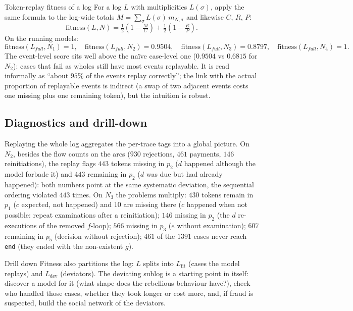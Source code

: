 \begin{definitionbox}{Token-replay fitness of a log}
For a log $L$ with multiplicities $L(\sigma)$, apply the same formula to the log-wide totals $M = \sum_{\sigma} L(\sigma)\, m_{N,\sigma}$ and likewise $C$, $R$, $P$:
$$\text{fitness}(L, N) = \tfrac{1}{2}\!\left(1 - \tfrac{M}{C}\right) + \tfrac{1}{2}\!\left(1 - \tfrac{R}{P}\right).$$
On the running models:
$$\text{fitness}(L_{full}, N_1) = 1, \quad \text{fitness}(L_{full}, N_2) = 0.9504, \quad \text{fitness}(L_{full}, N_3) = 0.8797, \quad \text{fitness}(L_{full}, N_4) = 1.$$
The event-level score sits well above the naïve case-level one ($0.9504$ vs $0.6815$ for $N_2$): cases that fail as wholes still have most events replayable. It is read informally as ``about $95\%$ of the events replay correctly''; the link with the actual proportion of replayable events is indirect (a swap of two adjacent events costs one missing plus one remaining token), but the intuition is robust.
\end{definitionbox}

\subsection{Diagnostics and drill-down}

Replaying the whole log aggregates the per-trace tags into a global picture. On $N_2$, besides the flow counts on the arcs ($930$ rejections, $461$ payments, $146$ reinitiations), the replay flags $443$ tokens missing in $p_2$ ($d$ happened although the model forbade it) and $443$ remaining in $p_2$ ($d$ was due but had already happened): both numbers point at the same systematic deviation, the sequential ordering violated $443$ times. On $N_3$ the problems multiply: $430$ tokens remain in $p_1$ ($c$ expected, not happened) and $10$ are missing there ($c$ happened when not possible: repeat examinations after a reinitiation); $146$ missing in $p_2$ (the $d$ re-executions of the removed $f$-loop); $566$ missing in $p_3$ ($e$ without examination); $607$ remaining in $p_5$ (decision without rejection); $461$ of the $1391$ cases never reach \texttt{end} (they ended with the non-existent $g$).
\begin{notebox}{Drill down}
Fitness also partitions the log: $L$ splits into $L_{\text{fit}}$ (cases the model replays) and $L_{\text{dev}}$ (deviators). The deviating sublog is a starting point in itself: discover a model for it (what shape does the rebellious behaviour have?), check who handled those cases, whether they took longer or cost more, and, if fraud is suspected, build the social network of the deviators.
\end{notebox}

